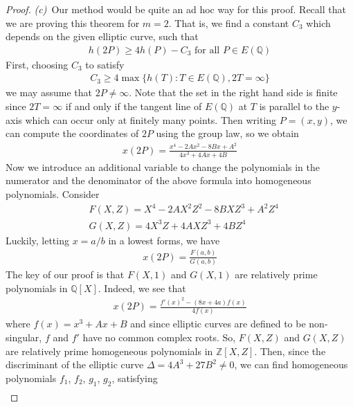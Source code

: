 \documentclass[11pt]{article}
\newcommand{\<}{\langle}
\renewcommand{\>}{\rangle}
\numberwithin{equation}{section}
\theoremstyle{plain}
\theoremstyle{definition}
\begin{document}
\begin{proof}
    \textit{(c)}\ Our method would be quite an ad hoc way for this proof. Recall that we are proving this theorem for \(m=2\). That is, we find a constant \(C_3\) which depends on the given elliptic curve, such that
        \begin{align*}
            h(2P) \ge 4h(P) - C_3 \text{    for all \(P \in E(\mathbb{Q})\)}
        \end{align*}
    First, choosing \(C_3\) to satisfy 
        \begin{align*}
            C_3 \ge 4 \max \{h(T): T \in E(\mathbb{Q}), 2T=\infty \}
        \end{align*}    
    we may assume that \(2P \ne \infty \). Note that the set in the right hand side is finite since \(2T = \infty \) if and only if the tangent line of \(E(\mathbb{Q})\) at \(T\) is parallel to the \(y\)-axis which can occur only at finitely many points. Then writing \(P = (x,y)\), we can compute the coordinates of \(2P\) using the group law, so we obtain
        \begin{align*}
            x(2P) = \frac{x^4 -2Ax^2 -8Bx + A^2}{4x^3+4Ax+4B}
        \end{align*}
    Now we introduce an additional variable to change the polynomials in the numerator and the denominator of the above formula into homogeneous polynomials. Consider 
        \begin{align*}
            &F(X,Z) = X^4 - 2AX^2Z^2-8BXZ^3+A^2Z^4 \\
            &G(X,Z) = 4X^3Z +4AXZ^3 + 4BZ^4
        \end{align*}
    Luckily, letting \(x = a/b \) in a lowest forms, we have
        \begin{align*}
            x(2P) = \frac{F(a,b)}{G(a,b)}
        \end{align*}
    The key of our proof is that \(F(X,1)\) and \(G(X,1)\) are relatively prime polynomials in \(\mathbb{Q}[X]\). Indeed, we see that 
        \begin{align*}
            x(2P) = \frac{f'(x)^2 - (8x+4a)f(x)}{4f(x)}
        \end{align*}
    where \(f(x)=x^3+Ax+B\) and since elliptic curves are defined to be non-singular, \(f\) and \(f'\) have no common complex roots. So, \(F(X,Z)\) and \(G(X,Z)\) are relatively prime homogeneous polynomials in \(\mathbb{Z}[X,Z]\). Then, since the discriminant of the elliptic curve \(\Delta = 4A^3 +27B^2 \ne 0 \), we can find homogeneous polynomials \(f_1\), \(f_2\), \(g_1\), \(g_2\), satisfying 
        \begin{align*}

\end{align*}
\end{proof}
\end{document}
